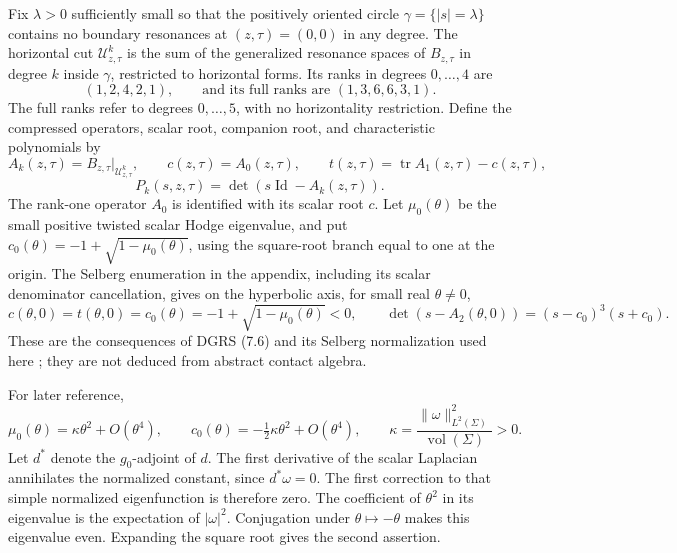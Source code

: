 \documentclass[11pt,letterpaper,reqno]{amsart}
\theoremstyle{remark}
\newcommand{\Id}{\operatorname{Id}}
\newcommand{\tr}{\operatorname{tr}}
\newcommand{\cU}{\mathcal U}
\begin{document}
Fix $\lambda>0$ sufficiently small so that the positively oriented
circle $\gamma=\{|s|=\lambda\}$ contains no boundary resonances at
$(z,\tau)=(0,0)$ in any degree. The horizontal cut $\cU^k_{z,\tau}$ is the
sum of the generalized resonance spaces of $B_{z,\tau}$ in degree
$k$ inside $\gamma$, restricted to horizontal forms. Its ranks in
degrees $0,\ldots,4$ are
\begin{equation}\label{ranks}
 (1,2,4,2,1),
 \qquad\text{and its full ranks are }(1,3,6,6,3,1).
\end{equation}
The full ranks refer to degrees $0,\ldots,5$, with no horizontality
restriction. Define the compressed operators, scalar root, companion
root, and characteristic polynomials by
\[
 A_k(z,\tau)=B_{z,\tau}|_{\cU^k_{z,\tau}},\qquad
 c(z,\tau)=A_0(z,\tau),\qquad
 t(z,\tau)=\tr A_1(z,\tau)-c(z,\tau),
\]
\[
 P_k(s,z,\tau)=\det(s\Id-A_k(z,\tau)).
\]
The rank-one operator $A_0$ is identified with its scalar root $c$.
Let $\mu_0(\theta)$ be the small positive twisted scalar Hodge
eigenvalue, and put $c_0(\theta)=-1+\sqrt{1-\mu_0(\theta)}$,
using the square-root branch equal to one at the origin.
The Selberg enumeration in the appendix, including
its scalar denominator cancellation, gives
on the hyperbolic axis, for small real $\theta\neq0$,
\begin{equation}\label{hyper}
 c(\theta,0)=t(\theta,0)=c_0(\theta)
       =-1+\sqrt{1-\mu_0(\theta)}<0,
 \qquad
 \det(s-A_2(\theta,0))=(s-c_0)^3(s+c_0).
\end{equation}
These are the consequences of DGRS (7.6) and its Selberg
normalization used here \cite{DGRS}; they are not deduced from abstract
contact algebra.


For later reference,
\begin{equation}\label{quadratic}
 \mu_0(\theta)=\kappa\theta^2+O(\theta^4),\qquad
 c_0(\theta)=-\tfrac12\kappa\theta^2+O(\theta^4),
 \qquad
 \kappa=\frac{\|\omega\|_{L^2(\Sigma)}^2}
                  {\operatorname{vol}(\Sigma)}>0.
\end{equation}
Let $d^*$ denote the $g_0$-adjoint of $d$. The first derivative of
the scalar Laplacian annihilates the normalized constant, since
$d^*\omega=0$. The first correction to that
simple normalized eigenfunction is therefore zero. The coefficient
of $\theta^2$ in its eigenvalue is the expectation of $|\omega|^2$.
Conjugation under $\theta\mapsto-\theta$ makes this eigenvalue even.
Expanding the square root gives the second assertion.
\end{document}
